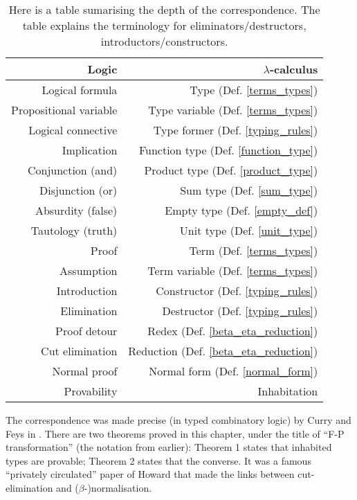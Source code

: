\begin{table}
  \centering
    \begin{tabular}{r|r}
        Logic & $\lambda$-calculus \\
        \hline  
        Logical formula & Type (Def. \ref{terms_types}) \\
        Propositional variable & Type variable (Def. \ref{terms_types}) \\
        Logical connective & Type former (Def. \ref{typing_rules}) \\
        Implication & Function type (Def. \ref{function_type}) \\
        Conjunction (and) & Product type (Def. \ref{product_type}) \\
        Disjunction (or) & Sum type (Def. \ref{sum_type}) \\
        Absurdity (false) & Empty type (Def. \ref{empty_def}) \\
        Tautology (truth) & Unit type (Def. \ref{unit_type}) \\
        Proof & Term (Def. \ref{terms_types}) \\
        Assumption & Term variable (Def. \ref{terms_types}) \\
        Introduction & Constructor (Def. \ref{typing_rules}) \\
        Elimination & Destructor (Def. \ref{typing_rules}) \\
        Proof detour & Redex (Def. \ref{beta_eta_reduction}) \\
        Cut elimination & Reduction (Def. \ref{beta_eta_reduction}) \\
        Normal proof & Normal form (Def. \ref{normal_form}) \\
        Provability & Inhabitation   
    \end{tabular}
    \caption{Here is a table sumarising the depth of the correspondence. The table explains the terminology for eliminators/destructors, introductors/constructors.}
    \label{tab1}
\end{table}

The correspondence was made precise (in typed combinatory logic) by Curry and Feys in \cite[Chapter 9]{curry1958combinatory}. There are two theorems proved in this chapter, under the title of ``F-P transformation'' (the notation from earlier): Theorem 1 states that inhabited types are provable; Theorem 2 states that the converse. It was a famous ``privately circulated'' paper of Howard \cite{howard1980formulae} that made the links between cut-elimination and ($\beta$-)normalisation.

